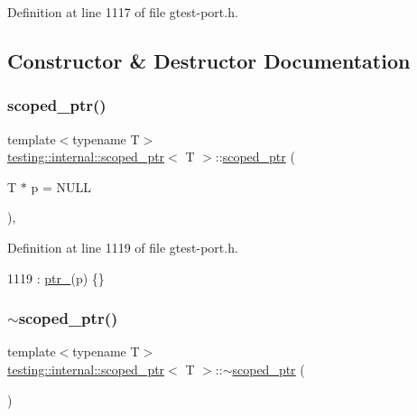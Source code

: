 Definition at line 1117 of file gtest-\/port.\+h.



\subsection{Constructor \& Destructor Documentation}
\mbox{\label{classtesting_1_1internal_1_1scoped__ptr_adb972432999a0c63720df148964ac2a5}} 
\subsubsection{\texorpdfstring{scoped\+\_\+ptr()}{scoped\_ptr()}}
{\footnotesize\ttfamily template$<$typename T$>$ \\
\hyperlink{classtesting_1_1internal_1_1scoped__ptr}{testing\+::internal\+::scoped\+\_\+ptr}$<$ T $>$\+::\hyperlink{classtesting_1_1internal_1_1scoped__ptr}{scoped\+\_\+ptr} (\begin{DoxyParamCaption}\item[{T $\ast$}]{p = {\ttfamily NULL} }\end{DoxyParamCaption})\hspace{0.3cm}{\ttfamily [inline]}, {\ttfamily [explicit]}}



Definition at line 1119 of file gtest-\/port.\+h.


\begin{DoxyCode}
1119 : \hyperlink{classtesting_1_1internal_1_1scoped__ptr_ab69d9f1f216ae91f8b8abca63e797397}{ptr\_}(p) \{\}
\end{DoxyCode}
\mbox{\label{classtesting_1_1internal_1_1scoped__ptr_ab721de9bf4369f002fb563e82352ee36}} 
\subsubsection{\texorpdfstring{$\sim$scoped\+\_\+ptr()}{~scoped\_ptr()}}
{\footnotesize\ttfamily template$<$typename T$>$ \\
\hyperlink{classtesting_1_1internal_1_1scoped__ptr}{testing\+::internal\+::scoped\+\_\+ptr}$<$ T $>$\+::$\sim$\hyperlink{classtesting_1_1internal_1_1scoped__ptr}{scoped\+\_\+ptr} (\begin{DoxyParamCaption}{ }\end{DoxyParamCaption})\hspace{0.3cm}{\ttfamily [inline]}}



